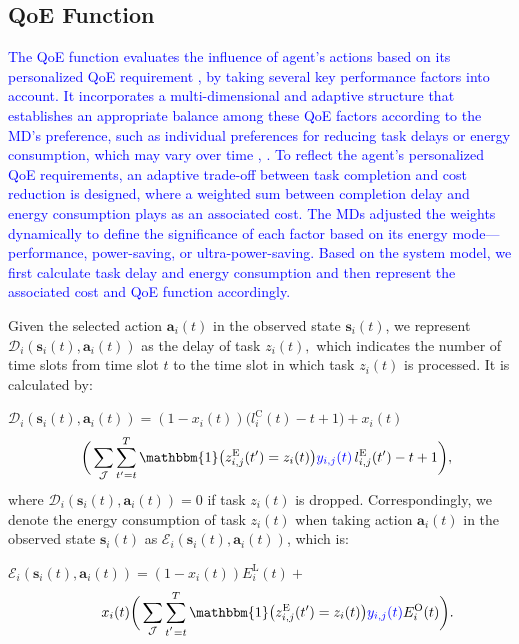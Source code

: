 \documentclass[12pt,draftclsnofoot,onecolumn]{IEEEtran}
\begin{document}
\subsection{QoE Function}
\textcolor{blue}{The QoE function evaluates the influence of agent's actions based on its personalized QoE requirement \cite{wang2017qoe}, by taking several key performance factors into account. It incorporates a multi-dimensional and adaptive structure that establishes an appropriate balance among these QoE factors according to the MD's preference, such as individual preferences for reducing task delays or energy consumption, which may vary over time \cite{wang2019intelligent}, \cite{mehrabi2019energy}. To reflect the agent’s personalized QoE requirements, an adaptive trade-off between task completion and cost reduction is designed, where a weighted sum between completion delay and energy consumption plays as an associated cost. The MDs adjusted the weights dynamically to define the significance of each factor based on its energy mode—performance, power-saving, or ultra-power-saving. 
	Based on the system model, we first calculate task delay and energy consumption and then represent the associated cost and QoE function accordingly.}

Given the selected action $\boldsymbol{a}_i(t)$ in the observed state $\boldsymbol{s}_i(t)$, we represent $\mathcal{D}_i(\boldsymbol{s}_i(t), \boldsymbol{a}_i(t))$ as the delay of task $z_i(t),$ which indicates the number of time slots from time slot $t$ to the time slot in which task $z_i(t)$ is processed. It is calculated by: \vspace{2mm}

$\mathcal{D}_i(\boldsymbol{s}_i(t),\boldsymbol{a}_i(t)) = (1-x_i(t))\Big(l_i^{\text{C}}(t) - t + 1\Big)  +  x_i(t)$
\begin{alignat}{1}
	\;\;\;\,\bigg( \sum\limits_{\mathcal{J}} \sum\limits_{t'=t}^{T} \mathbbm{1}\big(z_{i,j}^{\text{E}}(t') = z_i(t)\big) \textcolor{blue}{y_{i,j}(t)} \, l_{i,j}^{\text{E}}(t') - t +1\bigg),
	\label{21}  
\end{alignat} 
where $\mathcal{D}_i(\boldsymbol{s}_i(t),\boldsymbol{a}_i(t))= 0$ if task $z_i(t)$ is dropped. Correspondingly, we denote the energy consumption of task $z_i(t)$ when taking action $\boldsymbol{a}_i(t)$ in the observed state $\boldsymbol{s}_i(t)$ as $\mathcal{E}_i(\boldsymbol{s}_i(t),\boldsymbol{a}_i(t))$, which is: \vspace{1.7mm}


$\mathcal{E}_i(\boldsymbol{s}_i(t),\boldsymbol{a}_i(t)) = (1-x_i(t)) E_i^{\text{L}}(t)+$
\begin{alignat}{1}
	\hspace{0.9cm} x_i(t)\bigg( \sum\limits_{\mathcal{J}} \sum\limits_{t^{'}=t}^{T}\mathbbm{1}\big(z_{i,j}^{\text{E}}(t') = z_i(t)\big) \textcolor{blue}{y_{i,j}(t)}  E_i^{\text{O}}(t)  \bigg).
	\label{22}  
\end{alignat}
\end{document}
